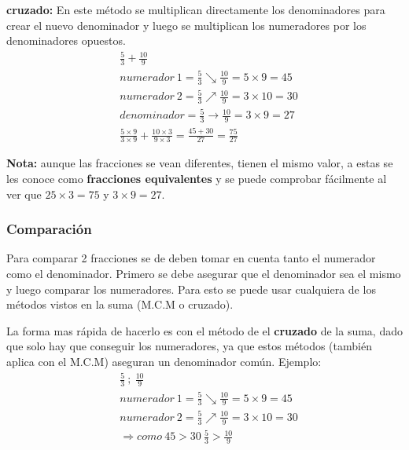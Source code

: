 \begin{itemize}
            \textbf{cruzado:}
            En este método se multiplican directamente los denominadores para
            crear el nuevo denominador y luego se multiplican los  numeradores por
            los denominadores opuestos.
            \begin{align*}
                &\frac{5}{3} + \frac{10}{9}\\
                &numerador\ 1 = \frac{5}{3} \searrow \frac{10}{9} = 5\times9 = 45\\
                &numerador\ 2 = \frac{5}{3}  \nearrow \frac{10}{9} = 3\times10 = 30\\
                &denominador = \frac{5}{3} \rightarrow \frac{10}{9} = 3\times9 = 27\\
                &\frac{5\times9}{3\times9} + \frac{10\times3}{9\times3} = \frac{45+30}{27} = \frac{75}{27}
            \end{align*}

            \textbf{Nota:} aunque las fracciones se vean diferentes, tienen el mismo
            valor, a estas se les conoce como \textbf{fracciones equivalentes}
            y se puede comprobar fácilmente al ver que $25\times3=75$ y $3\times9=27$.
    \end{itemize}

\subsubsection*{Comparación}\label{comparación}

    Para comparar 2 fracciones se de deben tomar en cuenta tanto el numerador como
    el denominador. Primero se debe asegurar que el denominador sea el mismo y
    luego comparar los numeradores. Para esto se puede usar cualquiera de los
    métodos vistos en la suma (M.C.M o cruzado).

    La forma mas rápida de hacerlo es con el método de el \textbf{cruzado} de
    la suma, dado que solo hay que conseguir los numeradores, ya que estos métodos
    (también aplica con el M.C.M) aseguran un denominador  común. Ejemplo:
        \begin{align*}
            &\frac{5}{3}\ ;\ \frac{10}{9}\\
            &numerador\ 1 = \frac{5}{3} \searrow \frac{10}{9} = 5\times9 = 45\\
            &numerador\ 2 = \frac{5}{3}  \nearrow \frac{10}{9} = 3\times10 = 30\\
            &\Rightarrow como\ 45>30\ \frac{5}{3} > \frac{10}{9}
        \end{align*}



